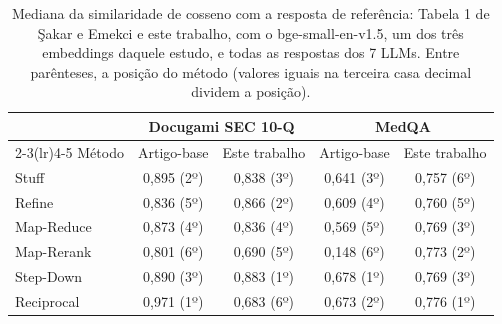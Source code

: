 \begin{table}[!t]
\centering
\footnotesize
\setlength{\tabcolsep}{4pt}
\caption{Mediana da similaridade de cosseno com a resposta de referência: Tabela 1 de Şakar e Emekci \cite{sakar2025rag} e este trabalho, com o bge-small-en-v1.5, um dos três embeddings daquele estudo, e todas as respostas dos 7 LLMs. Entre parênteses, a posição do método (valores iguais na terceira casa decimal dividem a posição).}
\label{tab:ancora}
\begin{tabular}{lcccc}
\toprule
 & \multicolumn{2}{c}{Docugami SEC 10-Q} & \multicolumn{2}{c}{MedQA} \\
\cmidrule(lr){2-3}\cmidrule(lr){4-5}
Método & Artigo-base & Este trabalho & Artigo-base & Este trabalho \\
\midrule
Stuff & 0,895 (2º) & 0,838 (3º) & 0,641 (3º) & 0,757 (6º) \\
Refine & 0,836 (5º) & 0,866 (2º) & 0,609 (4º) & 0,760 (5º) \\
Map-Reduce & 0,873 (4º) & 0,836 (4º) & 0,569 (5º) & 0,769 (3º) \\
Map-Rerank & 0,801 (6º) & 0,690 (5º) & 0,148 (6º) & 0,773 (2º) \\
Step-Down & 0,890 (3º) & 0,883 (1º) & 0,678 (1º) & 0,769 (3º) \\
Reciprocal & 0,971 (1º) & 0,683 (6º) & 0,673 (2º) & 0,776 (1º) \\
\bottomrule
\end{tabular}
\end{table}
